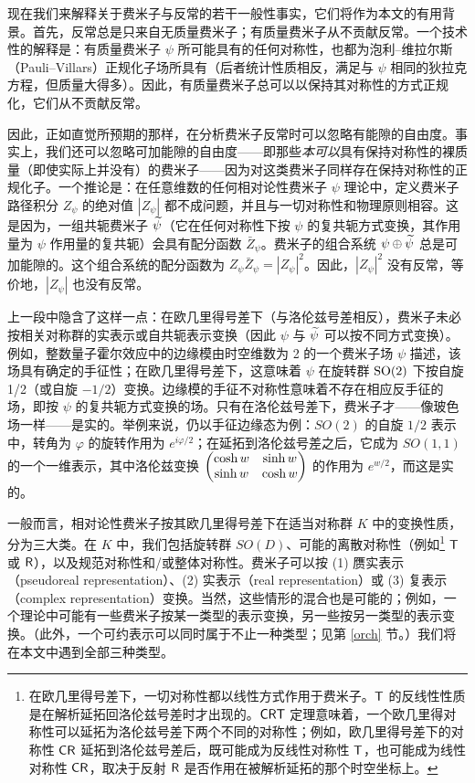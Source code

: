 现在我们来解释关于费米子与反常的若干一般性事实，它们将作为本文的有用背景。首先，反常总是只来自无质量费米子；有质量费米子从不贡献反常。一个技术性的解释是：有质量费米子 $\psi$ 所可能具有的任何对称性，也都为泡利--维拉尔斯（Pauli--Villars）正规化子场所具有（后者统计性质相反，满足与 $\psi$ 相同的狄拉克方程，但质量大得多）。因此，有质量费米子总可以以保持其对称性的方式正规化，它们从不贡献反常。

因此，正如直觉所预期的那样，在分析费米子反常时可以忽略有能隙的自由度。事实上，我们还可以忽略可加能隙的自由度------即那些\emph{本可以}具有保持对称性的裸质量（即使实际上并没有）的费米子------因为对这类费米子同样存在保持对称性的正规化子。一个推论是：在任意维数的任何相对论性费米子 $\psi$ 理论中，定义费米子路径积分 $Z_\psi$ 的绝对值 $|Z_\psi|$ 都不成问题，并且与一切对称性和物理原则相容。这是因为，一组共轭费米子 $\widetilde\psi$（它在任何对称性下按 $\psi$ 的复共轭方式变换，其作用量为 $\psi$ 作用量的复共轭）会具有配分函数 $\bar Z_\psi$。费米子的组合系统 $\psi\oplus \widetilde\psi$ 总是可加能隙的。这个组合系统的配分函数为 $Z_\psi \bar Z_\psi=|Z_\psi|^2$。因此，$|Z_\psi|^2$ 没有反常，等价地，$|Z_\psi|$ 也没有反常。

上一段中隐含了这样一点：在欧几里得号差下（与洛伦兹号差相反），费米子未必按相关对称群的实表示或自共轭表示变换（因此 $\psi$ 与 $\widetilde\psi$ 可以按不同方式变换）。例如，整数量子霍尔效应中的边缘模由时空维数为 2 的一个费米子场 $\psi$ 描述，该场具有确定的手征性；在欧几里得号差下，这意味着 $\psi$ 在旋转群 ${\mathrm{SO}}(2)$ 下按自旋 1/2（或自旋 $-1/2$）变换。边缘模的手征不对称性意味着不存在相应反手征的场，即按 $\psi$ 的复共轭方式变换的场。只有在洛伦兹号差下，费米子才------像玻色场一样------是实的。举例来说，仍以手征边缘态为例：$SO(2)$ 的自旋 $1/2$ 表示中，转角为 $\varphi$ 的旋转作用为 $e^{i\varphi/2}$；在延拓到洛伦兹号差之后，它成为 $SO(1,1)$ 的一个一维表示，其中洛伦兹变换 $\begin{pmatrix}\cosh w & \sinh w\cr \sinh w & \cosh w\end{pmatrix} $ 的作用为 $e^{w/2}$，而这是实的。

一般而言，相对论性费米子按其欧几里得号差下在适当对称群 $K$ 中的变换性质，分为三大类。在 $K$ 中，我们包括旋转群 $SO(D)$、可能的离散对称性（例如\footnote{在欧几里得号差下，一切对称性都以线性方式作用于费米子。${\sf T}$ 的反线性性质是在解析延拓回洛伦兹号差时才出现的。${\sf{CRT}}$ 定理意味着，一个欧几里得对称性可以延拓为洛伦兹号差下两个不同的对称性；例如，欧几里得号差下的对称性 ${\sf{CR}}$ 延拓到洛伦兹号差后，既可能成为反线性对称性 ${\sf T}$，也可能成为线性对称性 ${\sf{CR}}$，取决于反射 ${\sf R}$ 是否作用在被解析延拓的那个时空坐标上。} ${\sf T}$ 或 ${\sf R}$），以及规范对称性和/或整体对称性。费米子可以按 (1) 赝实表示（pseudoreal representation）、(2) 实表示（real representation）或 (3) 复表示（complex representation）变换。当然，这些情形的混合也是可能的；例如，一个理论中可能有一些费米子按某一类型的表示变换，另一些按另一类型的表示变换。（此外，一个可约表示可以同时属于不止一种类型；见第 \ref{orch} 节。）我们将在本文中遇到全部三种类型。

